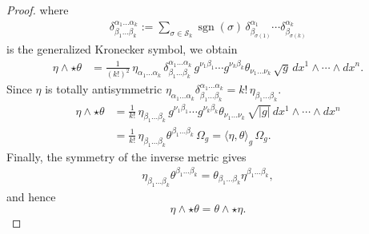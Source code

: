 \documentclass[../geometry_main.tex]{subfiles}
\begin{document}
\begin{proof}
where
{\small\begin{align}
    \delta^{\alpha_1\dots\alpha_k}_{\beta_1\dots\beta_k}
    :=
    \sum_{\sigma\in\mathcal S_k}
    \operatorname{sgn}(\sigma)\,
    \delta^{\alpha_1}_{\beta_{\sigma(1)}}\cdots
    \delta^{\alpha_k}_{\beta_{\sigma(k)}}
\end{align}}
is the generalized Kronecker symbol, we obtain
{\small
\begin{align}
    \eta\wedge\star\theta
    &=
    \frac{1}{(k!)^2}\,
    \eta_{\alpha_1\dots\alpha_k}\,
    \delta^{\alpha_1\dots\alpha_k}_{\beta_1\dots\beta_k}\,
    g^{\nu_1\beta_1}\cdots g^{\nu_k\beta_k}
    \theta_{\nu_1\dots\nu_k}\,\sqrt{g}\,
    dx^1\wedge\cdots\wedge dx^n .
\end{align}}
Since \(\eta\) is totally antisymmetric $\eta_{\alpha_1\dots\alpha_k}
\delta^{\alpha_1\dots\alpha_k}_{\beta_1\dots\beta_k}=
k!\,\eta_{\beta_1\dots\beta_k}$.
{\small
\begin{align}
    \eta\wedge\star\theta
    &=
    \frac{1}{k!}\,
    \eta_{\beta_1\dots\beta_k}\,
    g^{\nu_1\beta_1}\cdots g^{\nu_k\beta_k}
    \theta_{\nu_1\dots\nu_k}\,
    \sqrt{|g|}\,dx^1\wedge\cdots\wedge dx^n
    \\
    &=
    \frac{1}{k!}\,
    \eta_{\beta_1\dots\beta_k}\theta^{\beta_1\dots\beta_k}
    \,\Omega_g
    =
    \langle\eta,\theta\rangle_g\,\Omega_g.
\end{align}}
Finally, the symmetry of the inverse metric gives
{\small
\begin{align}
    \eta_{\beta_1\dots\beta_k}\theta^{\beta_1\dots\beta_k}
    =
    \theta_{\beta_1\dots\beta_k}\eta^{\beta_1\dots\beta_k},
\end{align}}
and hence
\[
    \eta\wedge\star\theta
    =
    \theta\wedge\star\eta .
\]


\end{proof}
\end{document}

